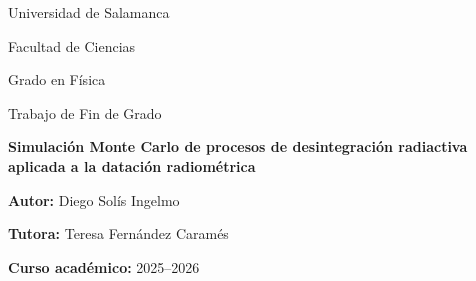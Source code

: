 \documentclass[12pt,a4paper]{article}
\newcommand{\tituloTFG}{Simulación Monte Carlo de procesos de desintegración radiactiva aplicada a la datación radiométrica}
\newcommand{\autorTFG}{Diego Solís Ingelmo}
\newcommand{\tutorTFG}{Teresa Fernández Caramés}
\newcommand{\gradoTFG}{Grado en Física}
\newcommand{\universidadTFG}{Universidad de Salamanca}
\newcommand{\facultadTFG}{Facultad de Ciencias}
\newcommand{\cursoTFG}{2025--2026}
\begin{document}
\begin{titlepage}
    \thispagestyle{empty}
    \centering

    {\Large \universidadTFG \par}
    \vspace{0.3cm}

    {\large \facultadTFG \par}
    \vspace{0.3cm}

    {\large \gradoTFG \par}

    \vspace{2.5cm}

    {\Large Trabajo de Fin de Grado \par}

    \vspace{1.5cm}

    {\Huge \bfseries \tituloTFG \par}

    \vfill

    {\large
        \textbf{Autor:} \autorTFG \par
        \vspace{0.3cm}

        \textbf{Tutora:} \tutorTFG \par
        \vspace{0.3cm}

        \textbf{Curso académico:} \cursoTFG \par
    }

    \vfill

\end{titlepage}
\end{document}
